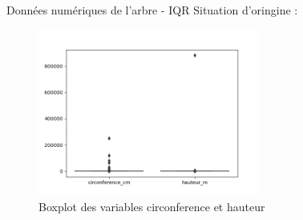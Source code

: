 \documentclass{beamer}
\begin{document}
\begin{frame}{Données numériques de l'arbre - IQR}
	Situation d'oringine :
	\begin{figure}
		\includegraphics[width=0.65\textwidth,keepaspectratio]{ressources/boxplot_outliers.png}
		\caption{Boxplot des variables \alert{circonference} et \alert{hauteur}}
	\end{figure}
\end{frame}
\end{document}
